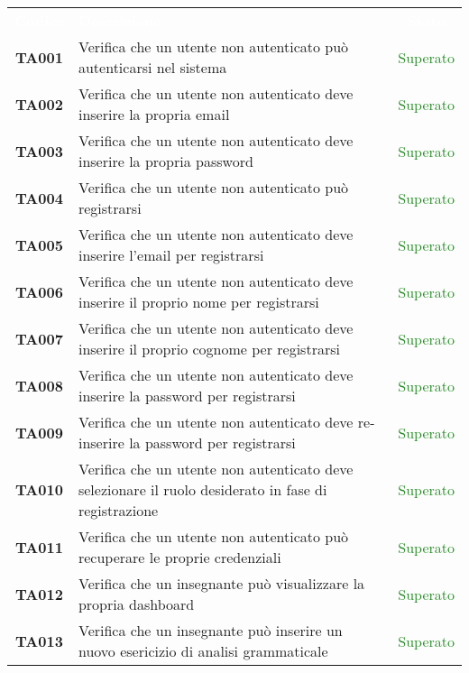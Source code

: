 \begin{tabularx}{\textwidth}{cXc}
	
	\rowcolor{greySWEight}
	
	\rowcolor{greySWEight}
	\textcolor{white}{\textbf{Codice}} & 
	\textcolor{white}{\textbf{Descrizione}} &
	\textcolor{white}{\textbf{Stato}} \\
	
	\textbf{TA001} & Verifica che un utente non autenticato può autenticarsi nel sistema & \textcolor{ForestGreen}{Superato} \\
	\textbf{TA002} & Verifica che un utente non autenticato deve inserire la propria email & \textcolor{ForestGreen}{Superato} \\
	\textbf{TA003} & Verifica che un utente non autenticato deve inserire la propria password & \textcolor{ForestGreen}{Superato} \\
	\textbf{TA004} & Verifica che un utente non autenticato può registrarsi & \textcolor{ForestGreen}{Superato} \\
	\textbf{TA005} & Verifica che un utente non autenticato deve inserire l'email per registrarsi & \textcolor{ForestGreen}{Superato} \\
	\textbf{TA006} & Verifica che un utente non autenticato deve inserire il proprio nome per registrarsi & \textcolor{ForestGreen}{Superato} \\
	\textbf{TA007} & Verifica che un utente non autenticato deve inserire il proprio cognome per registrarsi & \textcolor{ForestGreen}{Superato} \\
	\textbf{TA008} & Verifica che un utente non autenticato deve inserire la password per registrarsi & \textcolor{ForestGreen}{Superato} \\
	\textbf{TA009} & Verifica che un utente non autenticato deve re-inserire la password per registrarsi & \textcolor{ForestGreen}{Superato} \\
	\textbf{TA010} & Verifica che un utente non autenticato deve selezionare il ruolo desiderato in fase di registrazione & \textcolor{ForestGreen}{Superato} \\
	\textbf{TA011} & Verifica che un utente non autenticato può recuperare le proprie credenziali & \textcolor{ForestGreen}{Superato} \\
	\textbf{TA012} & Verifica che un insegnante può visualizzare la propria dashboard & \textcolor{ForestGreen}{Superato} \\
	\textbf{TA013} & Verifica che un insegnante può inserire un nuovo esericizio di analisi grammaticale & \textcolor{ForestGreen}{Superato} \\

\end{tabularx}
